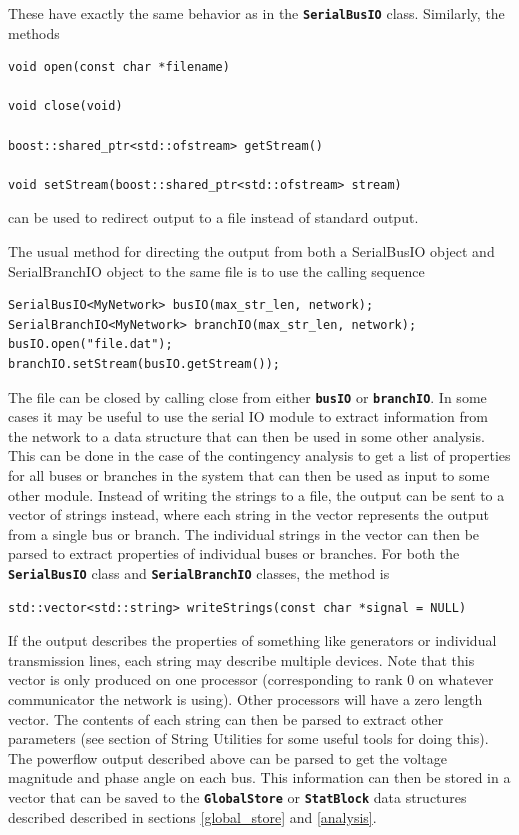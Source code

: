 These have exactly the same behavior as in the \texttt{\textbf{SerialBusIO}} class. Similarly, the methods

{
\color{red}
\begin{Verbatim}[fontseries=b]
void open(const char *filename)

void close(void)

boost::shared_ptr<std::ofstream> getStream()

void setStream(boost::shared_ptr<std::ofstream> stream)
\end{Verbatim}
}

can be used to redirect output to a file instead of standard output.

The usual method for directing the output from both a SerialBusIO object and SerialBranchIO object to the same file is to use the calling sequence

{
\color{red}
\begin{Verbatim}[fontseries=b]
SerialBusIO<MyNetwork> busIO(max_str_len, network);
SerialBranchIO<MyNetwork> branchIO(max_str_len, network);
busIO.open("file.dat");
branchIO.setStream(busIO.getStream());
\end{Verbatim}
}

The file can be closed by calling close from either \texttt{\textbf{busIO}} or \texttt{\textbf{branchIO}}.
In some cases it may be useful to use the serial IO module to extract information from the network to a data structure that can then be used in some other analysis. This can be done in the case of the contingency analysis to get a list of properties for all buses or branches in the system that can then be used as input to some other module. Instead of writing the strings to a file, the output can be sent to a vector of strings instead, where each string in the vector represents the output from a single bus or branch. The individual strings in the vector can then be parsed to extract properties of individual buses or branches. For both the \texttt{\textbf{SerialBusIO}} class and \texttt{\textbf{SerialBranchIO}} classes, the method is

{
\color{red}
\begin{Verbatim}[fontseries=b]
std::vector<std::string> writeStrings(const char *signal = NULL)
\end{Verbatim}
}

If the output describes the properties of something like generators or
individual transmission lines, each string may describe multiple devices. Note
that this vector is only produced on one processor (corresponding to rank 0 on
whatever communicator the network is using). Other processors will have a zero
length vector. The contents of each string can then be parsed to extract other
parameters (see section of String Utilities for some useful tools for doing
this). The powerflow output described above can be parsed to get the voltage
magnitude and phase angle on each bus. This information can then be stored in a
vector that can be saved to the \texttt{\textbf{GlobalStore}} or
\texttt{\textbf{StatBlock}} data structures described described in sections
\ref{global_store} and \ref{analysis}.
